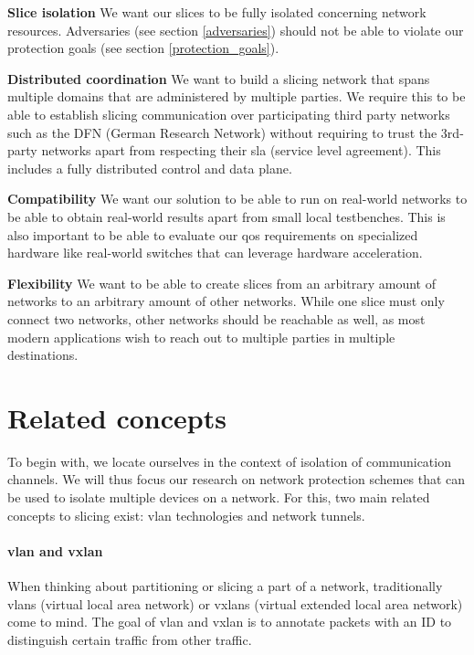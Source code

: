 \begin{description}[style=multiline, labelwidth=0.7cm]
    \item[\namedlabel{R1}{R1}] \textbf{Slice isolation} We want our slices to be fully isolated concerning network resources. Adversaries (see section \ref{adversaries}) should not be able to violate our protection goals (see section \ref{protection_goals}).
    \item[\namedlabel{R2}{R2}] \textbf{Distributed coordination} We want to build a slicing network that spans multiple domains that are administered by multiple parties. We require this to be able to establish slicing communication over participating third party networks such as the DFN (German Research Network) without requiring to trust the 3rd-party networks apart from respecting their \acrshort{sla} (service level agreement). This includes a fully distributed control and data plane.
    \item[\namedlabel{R3}{R3}] \textbf{Compatibility} We want our solution to be able to run on real-world networks to be able to obtain real-world results apart from small local testbenches. This is also important to be able to evaluate our \acrshort{qos} requirements on specialized hardware like real-world switches that can leverage hardware acceleration.
    \item[\namedlabel{R4}{R4}] \textbf{Flexibility} We want to be able to create slices from an arbitrary amount of networks to an arbitrary amount of other networks. While one slice must only connect two networks, other networks should be reachable as well, as most modern applications wish to reach out to multiple parties in multiple destinations.
\end{description}


\section{Related concepts}
To begin with, we locate ourselves in the context of isolation of communication channels. We will thus focus our research on network protection schemes that can be used to isolate multiple devices on a network. For this, two main related concepts to slicing exist: \acrshort{vlan} technologies and network tunnels.

\paragraph{\acrshort{vlan} and \acrshort{vxlan}} When thinking about partitioning or slicing a part of a network, traditionally \acrshort{vlan}s (virtual local area network) \cite{IEEE8021Q} or \acrshort{vxlan}s (virtual extended local area network) \cite{rfc7348} come to mind. The goal of \acrshort{vlan} and \acrshort{vxlan} is to annotate packets with an ID to distinguish certain traffic from other traffic.

